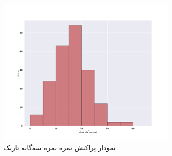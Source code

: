 \begin{figure}[htpb]
    \centering
    \includegraphics[width=0.8\textwidth]{./img/DTRHistogram.pdf}
    \caption{نمودار پراکنش نمره نمره سه‌گانه تاریک}
    \label{fig:DTRHistogram}
\end{figure}





